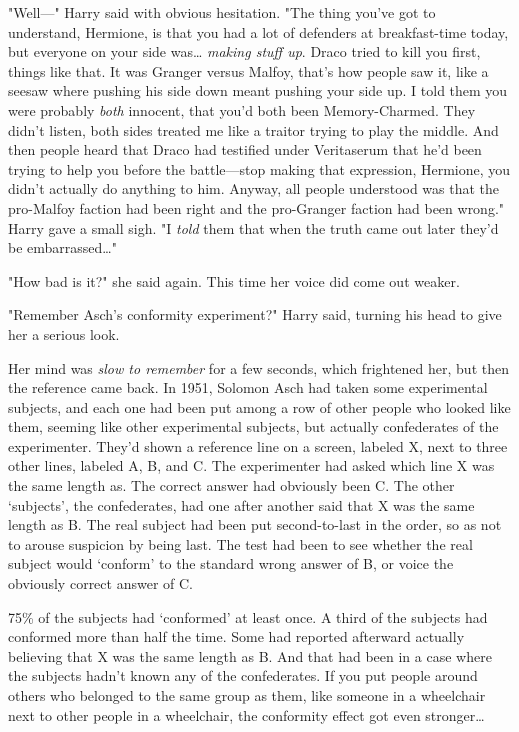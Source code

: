 "Well---" Harry said with obvious hesitation. "The thing you've got to 
understand, Hermione, is that you had a lot of defenders at breakfast-time 
today, but everyone on your side was{\ldots} \emph{making stuff up}. Draco 
tried to kill you first, things like that. It was Granger versus Malfoy, that's 
how people saw it, like a seesaw where pushing his side down meant pushing your 
side up. I told them you were probably \emph{both} innocent, that you'd both 
been Memory-Charmed. They didn't listen, both sides treated me like a traitor 
trying to play the middle. And then people heard that Draco had testified under 
Veritaserum that he'd been trying to help you before the battle---stop making 
that expression, Hermione, you didn't actually do anything to him. Anyway, all 
people understood was that the pro-Malfoy faction had been right and the 
pro-Granger faction had been wrong." Harry gave a small sigh. "I \emph{told} 
them that when the truth came out later they'd be embarrassed{\ldots}"

"How bad is it?" she said again. This time her voice did come out weaker.

"Remember Asch's conformity experiment?" Harry said, turning his head to give 
her a serious look.

Her mind was \emph{slow to remember} for a few seconds, which frightened her, 
but then the reference came back. In 1951, Solomon Asch had taken some 
experimental subjects, and each one had been put among a row of other people 
who looked like them, seeming like other experimental subjects, but actually 
confederates of the experimenter. They'd shown a reference line on a screen, 
labeled X, next to three other lines, labeled A, B, and C. The experimenter had 
asked which line X was the same length as. The correct answer had obviously 
been C. The other `subjects', the confederates, had one after another said that 
X was the same length as B. The real subject had been put second-to-last in the 
order, so as not to arouse suspicion by being last. The test had been to see 
whether the real subject would `conform' to the standard wrong answer of B, or 
voice the obviously correct answer of C.

75\% of the subjects had `conformed' at least once. A third of the subjects had 
conformed more than half the time. Some had reported afterward actually 
believing that X was the same length as B. And that had been in a case where 
the subjects hadn't known any of the confederates. If you put people around 
others who belonged to the same group as them, like someone in a wheelchair 
next to other people in a wheelchair, the conformity effect got even 
stronger{\ldots}

